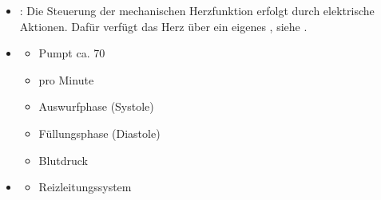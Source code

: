 {\begin{itemize}
  Im zeitlichen Verlauf unterscheidet man zwischen der 
  \begin{enumerate}
    \item {} () in der sich der Herzmuskel kontrahiert und Blut auswirft, und der 
    \item {} (), in der sich der Herzmuskel entspannt und sich die Herzkammern füllen.
  \end{enumerate}
  Dadurch schwankt der Druck in der Arterie in Abhängigkeit zum
  Herzauswurf: 
  In der  erreicht er sein ,
  und sinkt danach in der  des Herzens
  wieder ab, 
  bis das Herz neuerlich Blut auswirft.
  \item {}:
  Die Steuerung der mechanischen Herzfunktion erfolgt durch
  elektrische Aktionen. Dafür verfügt das Herz über ein
  eigenes , siehe
  .
\end{itemize}
}{
\begin{itemize}
  \item {}
  \begin{itemize}
    \item Pumpt \PerMin* ca. 70{\Ml*}
    \item {}\Liter* pro Minute
    \item Auswurfphase (Systole) 
    \item Füllungsphase (Diastole)
    \item Blutdruck
  \end{itemize}
  \item {}
  \begin{itemize}
    \item Reizleitungssystem
  \end{itemize}
\end{itemize}

}{}{}{}

%
%



